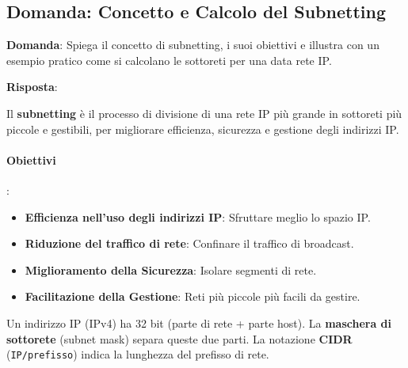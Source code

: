 
\subsection*{Domanda: Concetto e Calcolo del Subnetting}

\textbf{Domanda}: Spiega il concetto di subnetting, i suoi obiettivi e illustra con un esempio pratico come si calcolano le sottoreti per una data rete IP.

\textbf{Risposta}:

Il \textbf{subnetting} è il processo di divisione di una rete IP più grande in sottoreti più piccole e gestibili, per migliorare efficienza, sicurezza e gestione degli indirizzi IP.
\paragraph{Obiettivi}:
\begin{itemize}
    \item \textbf{Efficienza nell'uso degli indirizzi IP}: Sfruttare meglio lo spazio IP.
    \item \textbf{Riduzione del traffico di rete}: Confinare il traffico di broadcast.
    \item \textbf{Miglioramento della Sicurezza}: Isolare segmenti di rete.
    \item \textbf{Facilitazione della Gestione}: Reti più piccole più facili da gestire.
\end{itemize}
Un indirizzo IP (IPv4) ha 32 bit (parte di rete + parte host). La \textbf{maschera di sottorete} (subnet mask) separa queste due parti. La notazione \textbf{CIDR} (\lstinline{IP/prefisso}) indica la lunghezza del prefisso di rete.
